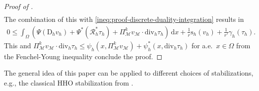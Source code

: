 \documentclass[a4paper]{amsart}
\numberwithin{equation}{section}
\renewcommand{\d}[1]{\,\mathrm{d}#1}
\renewcommand{\div}{\mathrm{div}}
\newcommand{\Mcal}{\mathcal{M}}
\newcommand{\D}{\mathrm{D}}
\newcommand{\s}{\mathrm{s}}
\theoremstyle{remark}
\begin{document}
\begin{proof}[Proof of ]
\begin{align*}
	\end{align*}
	The combination of this with \eqref{ineq:proof-discrete-duality-integration}
	results in
	\begin{align*}
		0\leq \int_\Omega (\Psi(\D_h v_h) + \Psi^*(\mathcal{R}_h^* \tau_h) + \Pi_\Mcal^k v_\Mcal \cdot \div_h \tau_h) \d{x} + \frac{1}{r}\s_h(v_h) + \frac{1}{r'}\gamma_h(\tau_h).
	\end{align*}
	This and $\Pi_\Mcal^k v_\Mcal \cdot \div_h \tau_h \leq \psi_h(x,\Pi_\Mcal^k v_\Mcal) + \psi_h^*(x,\div_h \tau_h)$ for a.e.~$x \in \Omega$ from the Fenchel-Young inequality \cite[p.~105]{Rockafellar1970} conclude the proof.
\end{proof}

The general idea of this paper can be applied to different choices of stabilizations, e.g., the classical HHO stabilization from \cite{DiPietroErnLemaire2014,DiPietroErn2015,DiPietroDroniou2017,DiPietroDroniou2020}.
\end{document}
